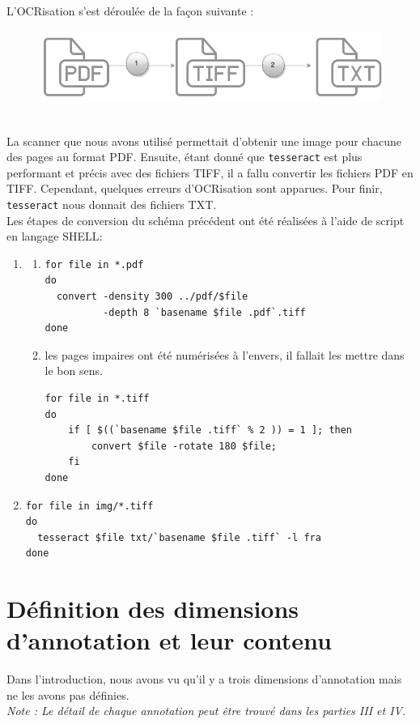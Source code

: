 \documentclass[a4paper, 11pt]{report}
\begin{document}
    L'OCRisation s'est déroulée de la façon suivante : 
    \begin{figure}[h]
    \centering
    \includegraphics[scale=.3]{img/OCRisation.png}
    \end{figure}\\
    La scanner que nous avons utilisé permettait d'obtenir une image pour chacune des pages au format PDF. Ensuite, étant donné que  \texttt{tesseract} est plus performant et précis avec des fichiers TIFF, il a fallu convertir les fichiers PDF en TIFF. Cependant, quelques erreurs d'OCRisation sont apparues. Pour finir,  \texttt{tesseract} nous donnait des fichiers TXT.\\
    Les étapes de conversion du schéma précédent ont été réalisées à l'aide de script en langage SHELL:
    \begin{enumerate}
        \item \begin{enumerate}
              \item 
           \begin{verbatim}
for file in *.pdf
do
  convert -density 300 ../pdf/$file
          -depth 8 `basename $file .pdf`.tiff
done
           \end{verbatim}
          \item les pages impaires ont été numérisées à l'envers, il fallait les mettre dans le bon sens.
          \begin{verbatim}
for file in *.tiff
do
    if [ $((`basename $file .tiff` % 2 )) = 1 ]; then
        convert $file -rotate 180 $file;
    fi
done
          \end{verbatim}
       \end{enumerate}
    \item 
    \begin{verbatim}
for file in img/*.tiff
do
  tesseract $file txt/`basename $file .tiff` -l fra
done 
    \end{verbatim}
    \end{enumerate}
    
    \section{Définition des dimensions d'annotation et leur contenu}
    Dans l'introduction, nous avons vu qu'il y a trois dimensions d'annotation mais ne les avons pas définies.\\
    \textit{Note : Le détail de chaque annotation peut être trouvé dans les parties III et IV.}
\end{document}
